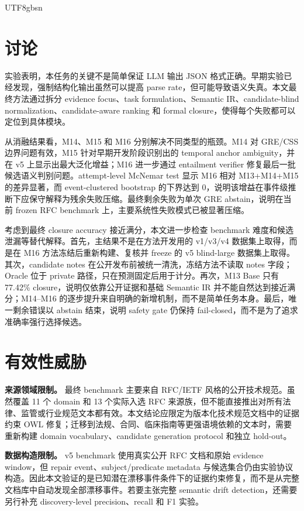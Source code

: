 \documentclass[11pt]{article}
\begin{document}
\begin{CJK*}{UTF8}{gbsn}
\section{讨论}

实验表明，本任务的关键不是简单保证 LLM 输出 JSON 格式正确。早期实验已经发现，强制结构化输出虽然可以提高 parse rate，但可能导致语义失真。本文最终方法通过拆分 evidence focus、task formulation、Semantic IR、candidate-blind normalization、candidate-aware ranking 和 formal closure，使得每个失败都可以定位到具体模块。

从消融结果看，M14、M15 和 M16 分别解决不同类型的瓶颈。M14 对 GRE/CSS 边界问题有效，M15 针对早期开发阶段识别出的 temporal anchor ambiguity，并在 v5 上显示出最大泛化增益；M16 进一步通过 entailment verifier 修复最后一批候选语义判别问题。attempt-level McNemar test 显示 M16 相对 M13+M14+M15 的差异显著，而 event-clustered bootstrap 的下界达到 0，说明该增益在事件级推断下应保守解释为残余失败压缩。最终剩余失败为单次 GRE abstain，说明在当前 frozen RFC benchmark 上，主要系统性失败模式已被显著压缩。

考虑到最终 closure accuracy 接近满分，本文进一步检查 benchmark 难度和候选泄漏等替代解释。首先，主结果不是在方法开发用的 v1/v3/v4 数据集上取得，而是在 M16 方法冻结后重新构建、复核并 freeze 的 v5 blind-large 数据集上取得。其次，candidate notes 在公开发布前被统一清洗，冻结方法不读取 notes 字段；Oracle 位于 private 路径，只在预测固定后用于计分。再次，M13 Base 只有 77.42\% closure，说明仅依靠公开证据和基础 Semantic IR 并不能自然达到接近满分；M14--M16 的逐步提升来自明确的新增机制，而不是简单任务本身。最后，唯一剩余错误以 abstain 结束，说明 safety gate 仍保持 fail-closed，而不是为了追求准确率强行选择候选。

\section{有效性威胁}

\textbf{来源领域限制。} 最终 benchmark 主要来自 RFC/IETF 风格的公开技术规范。虽然覆盖 11 个 domain 和 13 个实际入选 RFC 来源族，但不能直接推出对所有法律、监管或行业规范文本都有效。本文结论应限定为版本化技术规范文档中的证据约束 OWL 修复；迁移到法规、合同、临床指南等更强语境依赖的文本时，需要重新构建 domain vocabulary、candidate generation protocol 和独立 hold-out。

\textbf{数据构造限制。} v5 benchmark 使用真实公开 RFC 文档和原始 evidence window，但 repair event、subject/predicate metadata 与候选集合仍由实验协议构造。因此本文验证的是已知潜在漂移事件条件下的证据约束修复，而不是从完整文档库中自动发现全部漂移事件。若要主张完整 semantic drift detection，还需要另行补充 discovery-level precision、recall 和 F1 实验。


\end{CJK*}
\end{document}

